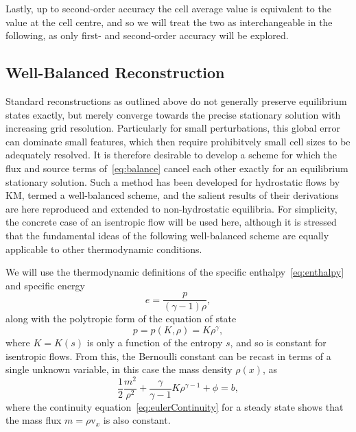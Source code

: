 Lastly, up to second-order accuracy the cell average value is equivalent to the value at the cell centre, and so we will treat the two as interchangeable in the following, as only first- and second-order accuracy will be explored. 

\subsection{Well-Balanced Reconstruction}
\label{subsec:wellBalanced}

Standard reconstructions as outlined above do not generally preserve equilibrium states exactly, but merely converge towards the precise stationary solution with increasing grid resolution. Particularly for small perturbations, this global error can dominate small features, which then require prohibitvely small cell sizes to be adequately resolved. It is therefore desirable to develop a scheme for which the flux and source terms of~\eqref{eq:balance} cancel each other exactly for an equilibrium stationary solution. Such a method has been developed for hydrostatic flows by KM, termed a well-balanced scheme, and the salient results of their derivations are here reproduced and extended to non-hydrostatic equilibria. For simplicity, the concrete case of an isentropic flow will be used here, although it is stressed that the fundamental ideas of the following well-balanced scheme are equally applicable to other thermodynamic conditions.

We will use the thermodynamic definitions of the specific enthalpy~\eqref{eq:enthalpy} and specific energy
\begin{equation}
e=\frac{p}{(\gamma-1)\rho},
\end{equation}
along with the polytropic form of the equation of state
\begin{equation}
p=p(K,\rho)=K\rho^{\gamma},
\end{equation}
where $K=K(s)$ is only a function of the entropy $s$, and so is constant for isentropic flows. From this, the Bernoulli constant can be recast in terms of a single unknown variable, in this case the mass density $\rho(x)$, as
\begin{equation}
\frac{1}{2}\frac{m^2}{\rho^2}+\frac{\gamma}{\gamma-1}K\rho^{\gamma-1}+\phi=b, \label{eq:bernoulli}
\end{equation}
where the continuity equation~\eqref{eq:eulerContinuity} for a steady state shows that the mass flux $m=\rho \mathrm{v}_x$ is also constant.

